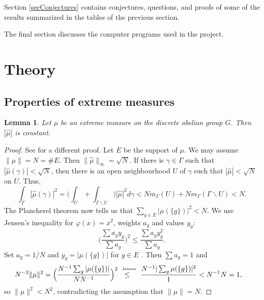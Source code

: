 \documentclass[letter,11pt]{amsart}
\newtheorem{lemma}[theorem]{Lemma}
\numberwithin{theorem}{section}
\theoremstyle{remark}
\numberwithin{equation}{section}
\begin{document}
Section \ref{secConjectures} contains conjectures, questions, and proofs of some of the results summarized in the 
tables of the
previous section.

The final section discusses the computer programs used in the project.

\section{Theory}\label{secTheory}

\subsection{Properties of extreme measures}

 
\begin{lemma}\label{lemExtrHatConstant}
Let $\mu$ be an extreme measure on the discrete abelian group $G$. Then $|\widehat\mu|$ is constant.
\end{lemma}

\begin{proof} See
\cite[Lemma 1.1]{MR627683} for a different proof.
Let $E$ be the support of $\mu$. We may assume $\|\mu\|=N=\#E$. Then $\|\widehat\mu\|_\infty = \sqrt N$.
If there is $\gamma\in \Gamma$ such that $|\widehat\mu(\gamma)|<\sqrt N$, then
there is an open neighbourhood $U$ of $\gamma$ such that $|\widehat\mu|<\sqrt N$ on $U$. Thus,\
\[
\int_\Gamma|\widehat\mu(\gamma)|^2=\Big(\int_U+\int_{\Gamma\backslash U}\Big)|\widehat\mu|^2d\gamma<
Nm_\Gamma(U)+Nm_\Gamma(\Gamma\backslash U)<N.
\]
The Plancherel theorem now tells us that $\sum_{g\in E}|\mu(\{g\})|^2<N.$ We 
use Jensen's inequality for $\varphi (x) = x^2$, weights $a_g$ and values $y_g$:
\[
\Big(\frac{\sum a_g y_g}{\sum a_g}\Big)^2\le \frac{\sum a_g y_g^2}{\sum a_g}.
\]
Set $a_g=1/N$    and $y_g = |\mu(\{g\})|$ for $g\in E$ . Then $\sum a_g=1$ and 
\begin{align*}
N^{-2}\|\mu\|^2
&=\Big(\frac{N^{-1}\sum_g |\mu(\{g\})|}{NN^{-1}}\Big)^2 
\ \overset{\text{\tiny Jensen}}{\le\phantom{|}}\  \frac{N^{-1}|\sum_g \mu(\{g\})|^2}{1}
< N^{-1}N 
=
1,
\end{align*}
so $\|\mu\|^2<N^2$, contradicting the assumption that $\|\mu\|=N$.
\end{proof}
\end{document}
